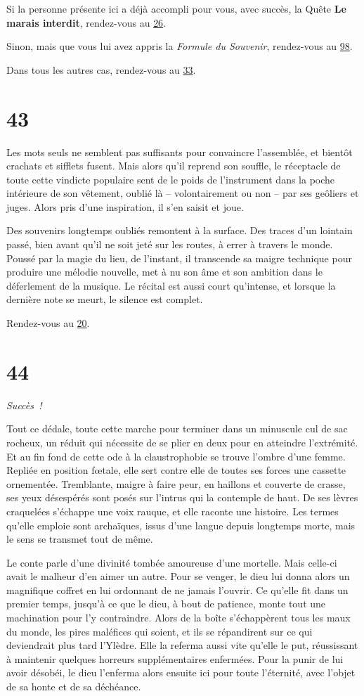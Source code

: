 \documentclass{report}
\newcommand{\gsection}[1]{
    \section{#1}
    \label{section-#1}
}
\newcommand{\glink}[1]{\hyperref[section-#1]{#1}}
\newcommand{\success}{\emph{Succès !}}
\begin{document}
Si la personne présente ici a déjà accompli pour vous, avec succès, la Quête \textbf{Le marais interdit}, rendez-vous au \glink{26}.

Sinon, mais que vous lui avez appris la \emph{Formule du Souvenir}, rendez-vous au \glink{98}.

Dans tous les autres cas, rendez-vous au \glink{33}.

\gsection{43}

Les mots seuls ne semblent pas suffisants pour convaincre l'assemblée, et bientôt crachats et sifflets fusent. Mais alors qu'il reprend son souffle, le réceptacle de toute cette vindicte populaire sent de le poids de l'instrument dans la poche intérieure de son vêtement, oublié là – volontairement ou non – par ses geôliers et juges. Alors pris d'une inspiration, il s'en saisit et joue.

Des souvenirs longtemps oubliés remontent à la surface. Des traces d'un lointain passé, bien avant qu'il ne soit jeté sur les routes, à errer à travers le monde. Poussé par la magie du lieu, de l'instant, il transcende sa maigre technique pour produire une mélodie nouvelle, met à nu son âme et son ambition dans le déferlement de la musique. Le récital est aussi court qu'intense, et lorsque la dernière note se meurt, le silence est complet.

Rendez-vous au \glink{20}.

\gsection{44}

\success

Tout ce dédale, toute cette marche pour terminer dans un minuscule cul de sac rocheux, un réduit qui nécessite de se plier en deux pour en atteindre l'extrémité. Et au fin fond de cette ode à la claustrophobie se trouve l'ombre d'une femme. Repliée en position fœtale, elle sert contre elle de toutes ses forces une cassette ornementée. Tremblante, maigre à faire peur, en haillons et couverte de crasse, ses yeux désespérés sont posés sur l'intrus qui la contemple de haut. De ses lèvres craquelées s'échappe une voix rauque, et elle raconte une histoire. Les termes qu'elle emploie sont archaïques, issus d'une langue depuis longtemps morte, mais le sens se transmet tout de même.

Le conte parle d'une divinité tombée amoureuse d'une mortelle. Mais celle-ci avait le malheur d'en aimer un autre. Pour se venger, le dieu lui donna alors un magnifique coffret en lui ordonnant de ne jamais l'ouvrir. Ce qu'elle fit dans un premier temps, jusqu'à ce que le dieu, à bout de patience, monte tout une machination pour l'y contraindre. Alors de la boîte s'échappèrent tous les maux du monde, les pires maléfices qui soient, et ils se répandirent sur ce qui deviendrait plus tard l'Ylèdre. Elle la referma aussi vite qu'elle le put, réussissant à maintenir quelques horreurs supplémentaires enfermées. Pour la punir de lui avoir désobéi, le dieu l'enferma alors ensuite ici pour toute l'éternité, avec l'objet de sa honte et de sa déchéance.
\end{document}
